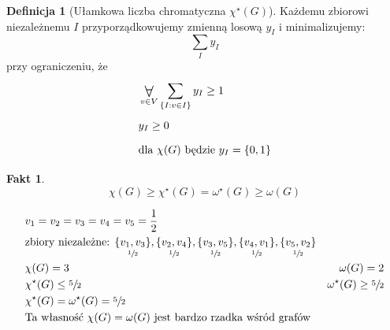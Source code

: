 \documentclass[a4paper,12pt]{article}
\theoremstyle{definition}%
\newtheorem{fact}{Fakt} %
\theoremstyle{definition}
\newtheorem{definition}{Definicja}%
\theoremstyle{problem}
\let\originalforall=\forall%
\renewcommand{\forall}{\mathop{\vcenter{\hbox{\Large$\originalforall$}}}}
\begin{document}
\begin{definition}[Ułamkowa liczba chromatyczna $\chi ^\star (G)$]
Każdemu zbiorowi niezależnemu $I$ przyporządkowujemy zmienną losową $y_I$ i minimalizujemy: $$\sum _I y_I$$ przy ograniczeniu, że 
\begin{align*}
&\forall _{v\in V} \sum _{\{I:v\in I\}}y_I\geq 1\\
&y_I\geq 0\\
&\text{dla }\chi (G) \text{ będzie } y_I=\{0,1\}
\end{align*}
\end{definition}

\begin{fact}
$$\chi (G)\geq \chi ^\star(G)=\omega ^\star(G)\geq \omega (G)$$
\end{fact}

\begin{figure}[H]
\centering
{}
\end{figure}
\begin{align*}
&v_1=v_2=v_3=v_4=v_5=\frac{1}{2}\\
&\text{zbiory niezależne: } 
\underset{\sfrac{1}{2}}{\{v_1,v_3\}}, \underset{\sfrac{1}{2}}{\{v_2,v_4\}},
\underset{\sfrac{1}{2}}{\{v_3,v_5\}}, \underset{\sfrac{1}{2}}{\{v_4,v_1\}},
\underset{\sfrac{1}{2}}{\{v_5,v_2\}}\\
&\chi (G)=3 & \omega (G) = 2\\
&\chi ^\star(G)\leq \sfrac{5}{2} & \omega ^\star(G)\geq \sfrac{5}{2}\\
&\chi ^\star(G) = \omega ^\star(G)= \sfrac{5}{2}\\
&\text{Ta własność } \chi (G)=\omega (G) \text{ jest bardzo rzadka wśród grafów}
\end{align*}
\end{document}

